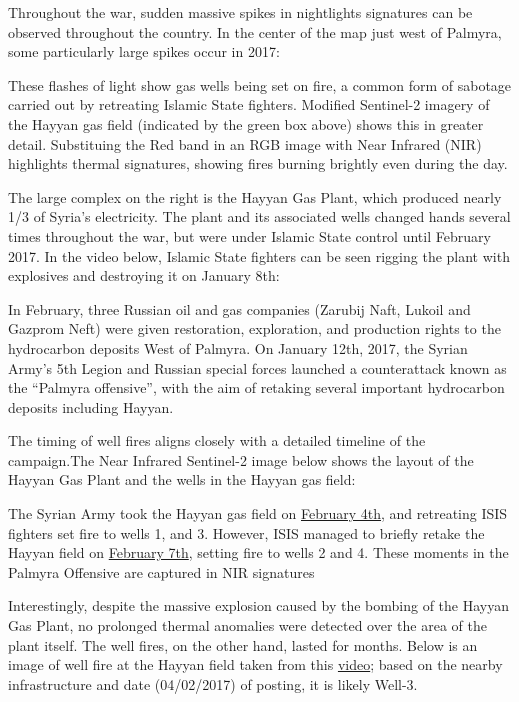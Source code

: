 \documentclass[
  letterpaper,
  DIV=11,
  numbers=noendperiod]{scrreprt}
\begin{document}
Throughout the war, sudden massive spikes in nightlights signatures can
be observed throughout the country. In the center of the map just west
of Palmyra, some particularly large spikes occur in 2017:

These flashes of light show gas wells being set on fire, a common form
of sabotage carried out by retreating Islamic State fighters. Modified
Sentinel-2 imagery of the Hayyan gas field (indicated by the green box
above) shows this in greater detail. Substituing the Red band in an RGB
image with Near Infrared (NIR) highlights thermal signatures, showing
fires burning brightly even during the day.

The large complex on the right is the Hayyan Gas Plant, which produced
nearly 1/3 of Syria's electricity. The plant and its associated wells
changed hands several times throughout the war, but were under Islamic
State control until February 2017. In the video below, Islamic State
fighters can be seen rigging the plant with explosives and destroying it
on January 8th:

In February, three Russian oil and gas companies (Zarubij Naft, Lukoil
and Gazprom Neft) were given restoration, exploration, and production
rights to the hydrocarbon deposits West of Palmyra. On January 12th,
2017, the Syrian Army's 5th Legion and Russian special forces launched a
counterattack known as the ``Palmyra offensive'', with the aim of
retaking several important hydrocarbon deposits including Hayyan.

The timing of well fires aligns closely with a detailed timeline of the
campaign.The Near Infrared Sentinel-2 image below shows the layout of
the Hayyan Gas Plant and the wells in the Hayyan gas field:

The Syrian Army took the Hayyan gas field on
\href{https://www.almasdarnews.com/article/syrian-army-liberates-hayyan-gas-fields-west-palmyra/}{February
4th}, and retreating ISIS fighters set fire to wells 1, and 3. However,
ISIS managed to briefly retake the Hayyan field on
\href{https://www.almasdarnews.com/article/isis-retakes-hayyan-gas-fields-new-bid-expand-west-palmyra/}{February
7th}, setting fire to wells 2 and 4. These moments in the Palmyra
Offensive are captured in NIR signatures

Interestingly, despite the massive explosion caused by the bombing of
the Hayyan Gas Plant, no prolonged thermal anomalies were detected over
the area of the plant itself. The well fires, on the other hand, lasted
for months. Below is an image of well fire at the Hayyan field taken
from this \href{https://www.youtube.com/watch?v=WFe9abYyqK0}{video};
based on the nearby infrastructure and date (04/02/2017) of posting, it
is likely Well-3.
\end{document}

